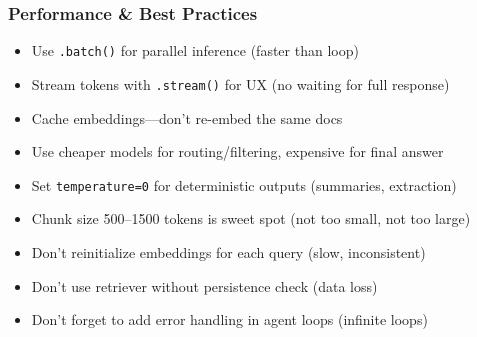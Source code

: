 \documentclass[aspectratio=169,11pt]{beamer}
\begin{document}
\begin{frame}
  \frametitle{Performance \& Best Practices}

  \begin{conceptbox}[Optimization]
    \begin{itemize}
      \item Use \texttt{.batch()} for parallel inference (faster than loop)
      \item Stream tokens with \texttt{.stream()} for UX (no waiting for full response)
      \item Cache embeddings—don't re-embed the same docs
      \item Use cheaper models for routing/filtering, expensive for final answer
      \item Set \texttt{temperature=0} for deterministic outputs (summaries, extraction)
      \item Chunk size 500–1500 tokens is sweet spot (not too small, not too large)
    \end{itemize}
  \end{conceptbox}

  \begin{warningbox}
    \small
    \begin{itemize}
      \setlength{\itemsep}{1pt}
      \item Don't reinitialize embeddings for each query (slow, inconsistent)
      \item Don't use retriever without persistence check (data loss)
      \item Don't forget to add error handling in agent loops (infinite loops)
    \end{itemize}
  \end{warningbox}
\vspace{-0.2cm}
\end{frame}
\end{document}
